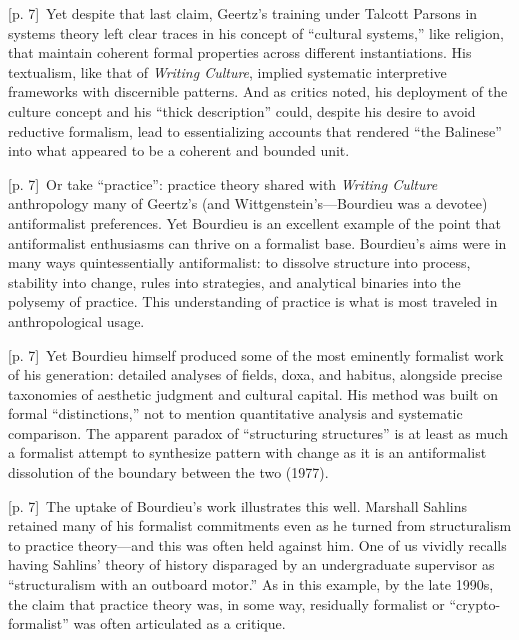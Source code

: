 \documentclass[10pt,a4paper]{article}
\begin{document}
{\scriptsize\color{gray} [p. 7]}\ Yet despite that last claim, Geertz’s training under Talcott Parsons in systems theory left clear traces in his concept of “cultural systems,” like religion, that maintain coherent formal properties across different instantiations. His textualism, like that of \textit{Writing Culture}, implied systematic interpretive frameworks with discernible patterns. And as critics noted, his deployment of the culture concept and his “thick description” could, despite his desire to avoid reductive formalism, lead to essentializing accounts that rendered “the Balinese” into what appeared to be a coherent and bounded unit.\par
{\scriptsize\color{gray} [p. 7]}\ Or take “practice”: practice theory shared with \textit{Writing Culture} anthropology many of Geertz’s (and Wittgenstein’s—Bourdieu was a devotee) antiformalist preferences. Yet Bourdieu is an excellent example of the point that antiformalist enthusiasms can thrive on a formalist base. Bourdieu’s aims were in many ways quintessentially antiformalist: to dissolve structure into process, stability into change, rules into strategies, and analytical binaries into the polysemy of practice. This understanding of practice is what is most traveled in anthropological usage.\par
{\scriptsize\color{gray} [p. 7]}\ Yet Bourdieu himself produced some of the most eminently formalist work of his generation: detailed analyses of fields, doxa, and habitus, alongside precise taxonomies of aesthetic judgment and cultural capital. His method was built on formal “distinctions,” not to mention quantitative analysis and systematic comparison. The apparent paradox of “structuring structures” is at least as much a formalist attempt to synthesize pattern with change as it is an antiformalist dissolution of the boundary between the two (1977).\par
{\scriptsize\color{gray} [p. 7]}\ The uptake of Bourdieu’s work illustrates this well. Marshall Sahlins retained many of his formalist commitments even as he turned from structuralism to practice theory—and this was often held against him. One of us vividly recalls having Sahlins’ theory of history disparaged by an undergraduate supervisor as “structuralism with an outboard motor.” As in this example, by the late 1990s, the claim that practice theory was, in some way, residually formalist or “crypto-formalist” was often articulated as a critique.\par
\end{document}
